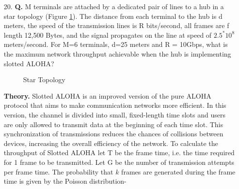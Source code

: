 \documentclass[main.tex]{subfiles}
\begin{document}
\begin{enumerate}
\begin{enumerate}
\begin{verbatim}
    # CSMA/CA simplified pseudo-code 
    N=1 
    while N<= max : 
        waitUntil(free(channel)) 
        if correct(last_frame) : 
          wait(channel_free_during_t >=DIFS) 
        else: 
          wait(channel_free_during_t >=EIFS) 
    
        back-off_time = int(random[0,min(255,7*(2^(N-1)))])*slotTime 
        wait(channel free during backoff_time) 
        # backoff timer is frozen while channel is sensed to be busy 
        send(frame) 
        wait(ack or timeout) 
        if received(ack) 
          # frame received correctly 
          break 
        else: 
          # retransmission required 
          N=N+1 
\end{verbatim}
        
    \end{enumerate}
    
\item[20.] \textbf{Q.} M terminals are attached by a dedicated pair of lines to a hub in a star topology (Figure \ref{fig:20q_a}). The distance from each terminal to the hub is d meters, the speed of the transmission lines is R bits/second, all frames are f length 12,500 Bytes, and the signal propagates on the line at speed of $2.5^{*} 10^{8}$ meters/second. For M=6 terminals, d=25 meters and R = 10Gbps, what is the maximum network throughput achievable when the hub is implementing slotted ALOHA? 

\begin{figure}
\centering{}
\caption{Star Topology}
\label{fig:20q_a}
\end{figure}

\textbf{Theory.} Slotted ALOHA is an improved version of the pure ALOHA protocol that aims to make communication networks more efficient. In this version, the channel is divided into small, fixed-length time slots and users are only allowed to transmit data at the beginning of each time slot. This synchronization of transmissions reduces the chances of collisions between devices, increasing the overall efficiency of the network. To calculate the throughput of Slotted ALOHA let $\mathrm{T}$ be the frame time, i.e. the time required for 1 frame to be transmitted. Let $\mathrm{G}$ be the number of transmission attempts per frame time. The probability that $k$ frames are generated during the frame time is given by the Poisson distribution-


\end{enumerate}
\end{document}

